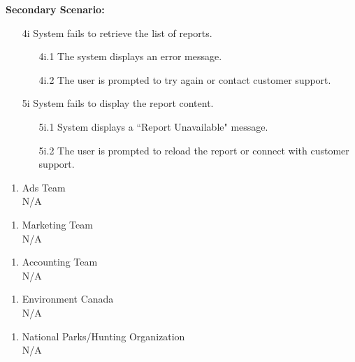 \documentclass[]{article}
\begin{document}
\begin{enumerate}[{\bf BE1.}]
\begin{enumerate}[{\bf VP1.}]
            \textbf{Secondary Scenario:}
            \begin{enumerate}
                \item[4i] System fails to retrieve the list of reports.
                \begin{enumerate}
                    \item[4i.1] The system displays an error message.
                    \item[4i.2] The user is prompted to try again or contact customer support.
                \end{enumerate}
                \item[5i] System fails to display the report content.
                \begin{enumerate}
                    \item[5i.1] System displays a “Report Unavailable" message.
                    \item[5i.2] The user is prompted to reload the report or connect with customer support.
                \end{enumerate}
            \end{enumerate}
    \end{enumerate}

    \begin{enumerate}[{\bf VP2.}]
        \item Ads Team \\ 
        N/A
    \end{enumerate}

    \begin{enumerate}[{\bf VP3.}]
        \item Marketing Team \\
        N/A
    \end{enumerate}

    \begin{enumerate}[{\bf VP4.}]
        \item Accounting Team \\
        N/A
    \end{enumerate}

    \begin{enumerate}[{\bf VP5.}]
        \item Environment Canada \\
        N/A
    \end{enumerate}

    \begin{enumerate}[{\bf VP6.}]
        \item National Parks/Hunting Organization \\
        N/A
    \end{enumerate}


\end{enumerate}
\end{document}

